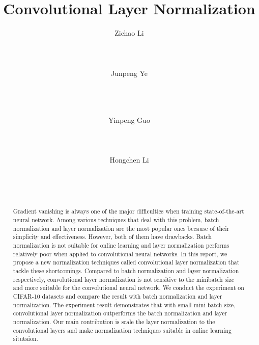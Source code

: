 \documentclass{sig-alternate}
\begin{document}
\title{Convolutional Layer Normalization}
\author{
\alignauthor
Zichao Li\\
    \\
    \\
    \\
\alignauthor
Junpeng Ye\\
    \\
    \\
    \\
\and
\alignauthor
Yinpeng Guo\\
    \\
    \\
    \\
\alignauthor
Hongchen Li\\
    \\
    \\
    \\
}
\maketitle
\begin{abstract}
Gradient vanishing is always one of the major difficulties when training state-of-the-art neural network. Among various techniques that deal with this problem, batch normalization and layer normalization are the most popular ones because of their simplicity and effectiveness. However, both of them have drawbacks. Batch normalization is not suitable for online learning and layer normalization performs relatively poor when applied to convolutional neural networks. In this report, we propose a new normalization techniques called convolutional layer normalization that tackle these shortcomings. Compared to batch normalization and layer normalization respectively, convolutional layer normalization is not sensitive to the minibatch size and more suitable for the convolutional neural network. We conduct the experiment on CIFAR-10 datasets and compare the result with batch normalization and layer normalization. The experiment result demonstrates that with small mini batch size, convolutional layer normalization outperforms the batch normalization and layer normalization. Our main contribution is scale the layer normalization to the convolutional layers and make normalization techniques suitable in online learning situtaion. 

\end{abstract}
\end{document}
